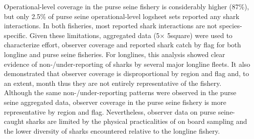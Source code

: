 \documentclass[12pt]{SCreport}
\begin{document}
Operational-level coverage in the purse seine fishery is considerably higher (87\%), but only 2.5\% of purse seine operational-level logsheet sets reported any shark interactions. In both fisheries, most reported shark interactions are not species-specific. Given these limitations, aggregated data (5\degree $\times$ 5\degree square) were used to characterize effort, observer coverage and reported shark catch by flag for both longline and purse seine fisheries. For longlines, this analysis showed clear evidence of non-/under-reporting of sharks by several major longline fleets. It also demonstrated that observer coverage is disproportional by region and flag and, to an extent, month thus they are not entirely representative of the fishery. Although the same non-/under-reporting patterns were observed in the purse seine aggregated data, observer coverage in the purse seine fishery is more representative by region and flag. Nevertheless, observer data on purse seine-caught sharks are limited by the physical practicalities of on board sampling and the lower diversity of sharks encountered relative to the longline fishery.
\end{document}
